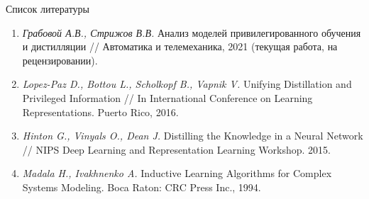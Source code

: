 \documentclass[10pt,pdf,hyperref={unicode}]{beamer}
\begin{document}
\begin{frame}{Список литературы}
\justifying
\begin{enumerate}
	\item \textit{Грабовой А.В., Стрижов В.В.} Анализ моделей привилегированного обучения и дистилляции // Автоматика и телемеханика, 2021 (текущая работа, на рецензировании).
	\item \textit{Lopez-Paz D., Bottou L., Scholkopf B., Vapnik V.} Unifying Distillation and Privileged Information // In International Conference on Learning Representations. Puerto Rico, 2016.
	\item \textit{Hinton G., Vinyals O., Dean J.} Distilling the Knowledge in a Neural Network // NIPS Deep Learning and Representation Learning Workshop. 2015.
	\item \textit{Madala H., Ivakhnenko A.} Inductive Learning Algorithms for Complex Systems Modeling. Boca Raton: CRC Press Inc., 1994.
\end{enumerate}
\end{frame}

\end{document}
